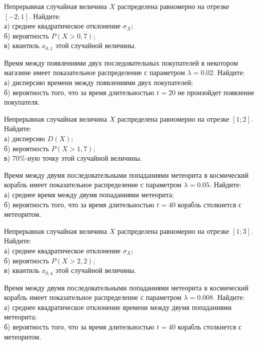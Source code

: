 \vfill

\newpage\setcounter{zad}{0}

\z Непрерывная случайная величина $X$ распределена равномерно на отрезке $[-2; 1]$. Найдите: \\ \quad а) среднее квадратическое отклонение $\sigma_X$; \\ \quad б) вероятность $P(X>0{,}7)$; \\ \quad в) квантиль $x_{0{,}1}$ этой случайной величины.


\vfill

\z Время между появлениями двух последовательных покупателей в некотором магазине имеет показательное распределение с параметром $\lambda = 0.02$. Найдите: \\ \quad а) дисперсию времени между появлениями двух покупателей; \\ \quad б) вероятность того, что за время длительностью $t = 20$ не произойдет появление покупателя.
 

\vfill

\newpage\setcounter{zad}{0}

\z Непрерывная случайная величина $X$ распределена равномерно на отрезке $[1; 2]$. Найдите: \\ \quad а) дисперсию $D(X)$; \\ \quad б) вероятность $P(X>1{,}7)$; \\ \quad в) $70\%$-ную точку этой случайной величины.


\vfill

\z Время между двумя последовательными попаданиями метеорита в космический корабль имеет показательное распределение с параметром $\lambda = 0.05$. Найдите: \\ \quad а) среднее время между двумя попаданиями метеорита; \\ \quad б) вероятность того, что за время длительностью $t = 40$ корабль  столкнется с метеоритом.
 

\vfill

\newpage\setcounter{zad}{0}

\z Непрерывная случайная величина $X$ распределена равномерно на отрезке $[1; 3]$. Найдите: \\ \quad а) среднее квадратическое отклонение $\sigma_X$; \\ \quad б) вероятность $P(X>2{,}2)$; \\ \quad в) квантиль $x_{0{,}4}$ этой случайной величины.


\vfill

\z Время между двумя последовательными попаданиями метеорита в космический корабль имеет показательное распределение с параметром $\lambda = 0.008$. Найдите: \\ \quad а) среднее квадратическое отклонение времени между двумя попаданиями метеорита; \\ \quad б) вероятность того, что за время длительностью $t = 40$ корабль  столкнется с метеоритом.
 

